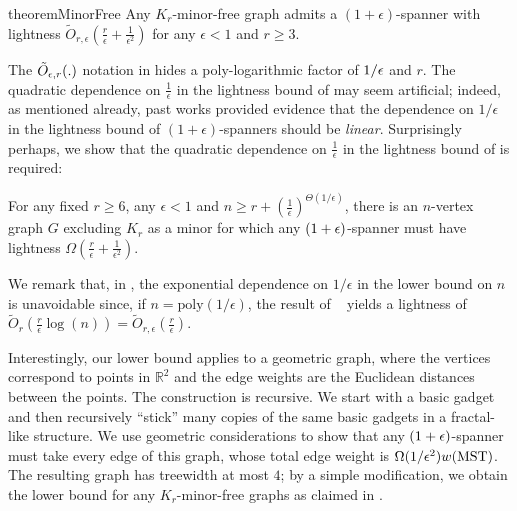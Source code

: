 \begin{restatable}{theorem}{MinorFree}
	\label{thm:minor-free-opt-lightness}
	Any $K_r$-minor-free graph admits a $(1+\epsilon)$-spanner with lightness $\tilde{O}_{r,\epsilon}(\frac{r}{\epsilon} + \frac{1}{\epsilon^2})$ for any $\epsilon< 1$ and $r\geq 3$. 
\end{restatable}

The $\tilde{O}_{\epsilon,r}(.)$ notation in  hides a poly-logarithmic factor of $1/\epsilon$ and $r$.   The quadratic dependence on $\frac{1}{\epsilon}$ in the lightness bound of   may seem artificial;
indeed, as mentioned already, past works \cite{ADDJS93, Grigni00,GS02} provided evidence that the dependence on $1/\epsilon$ 
in the lightness bound of $(1+\epsilon)$-spanners should be \emph{linear}. Surprisingly perhaps, we show that the quadratic dependence on $\frac{1}{\epsilon}$ in the lightness bound of  is required:

\begin{theorem}\label{thm:minor-free-lowerbound}
For any fixed $r\geq 6$, any  $\epsilon < 1$  and $n \geq r + (\frac{1}{\epsilon})^{\Theta(1/\epsilon)}$, there is an $n$-vertex graph $G$ excluding $K_r$ as a minor for which any $(1+\epsilon)$-spanner must have lightness $\Omega(\frac{r}{\epsilon} + \frac{1}{\epsilon^2})$.
\end{theorem}	
	
We remark that, in , the exponential dependence on $1/\epsilon$ in the lower bound on $n$ is unavoidable since, if $n = \mathrm{poly}(1/\epsilon)$, the result of ~\cite{GS02} yields a lightness of
$\tilde{O}_r(\frac{r}{\epsilon}\log(n)) = \tilde{O}_{r,\epsilon}(\frac{r}{\epsilon})$.

Interestingly, our lower bound  applies to a geometric graph, where the vertices correspond to points in $\mathbb R^2$ and the edge weights are the Euclidean distances between the points. The construction is recursive. We start with a basic gadget and then recursively ``stick'' many copies of the same basic gadgets in a fractal-like structure. We use geometric considerations to show that any $(1+\epsilon)$-spanner must take every edge of this graph, whose total edge weight is $\Omega(1/\epsilon^2)w(\mathrm{MST})$. The resulting graph has treewidth at most $4$; by a simple modification, we obtain the lower bound for any $K_r$-minor-free graphs as claimed in .

